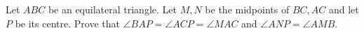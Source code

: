 Let $ABC$ be an equilateral triangle. Let $M,N$ be the midpoints of $BC,AC$ and let $P$ be its centre. Prove that $\angle BAP=\angle ACP=\angle MAC$ and $\angle ANP=\angle AMB$.
